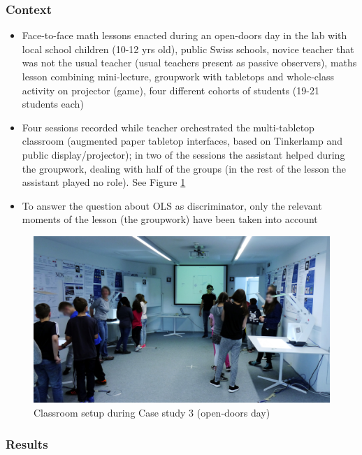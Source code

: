 \documentclass[10pt,journal,compsoc]{IEEEtran}
\begin{document}
\subsubsection{Context}

\begin{itemize}
\item Face-to-face math lessons enacted during an open-doors day in the lab with local school children (10-12 yrs old), public Swiss schools, novice teacher that was not the usual teacher (usual teachers present as passive observers), maths lesson combining mini-lecture, groupwork with tabletops and whole-class activity on projector (game), four different cohorts of students (19-21 students each)
\item Four sessions recorded while teacher orchestrated the multi-tabletop classroom (augmented paper tabletop interfaces, based on Tinkerlamp \cite{do2012tinkerlamp} and public display/projector); in two of the sessions the assistant helped during the groupwork, dealing with half of the groups (in the rest of the lesson the assistant played no role). See Figure \ref{fig:case3picture}
\item To answer the question about OLS as discriminator, only the relevant moments of the lesson (the groupwork) have been taken into account
\end{itemize}

\begin{figure}[!t]
\centering
\includegraphics[width=\linewidth]{img/Case3Picture}
\caption{Classroom setup during Case study 3 (open-doors day)}
\label{fig:case3picture}
\end{figure}


\subsubsection{Results}
\end{document}
